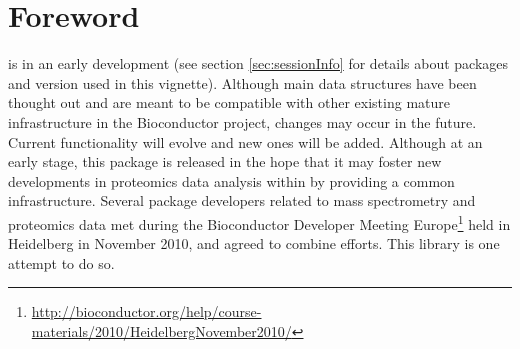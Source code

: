 \section*{Foreword}

 is in an early development %
(see section \ref{sec:sessionInfo} for details about packages and version used in this vignette). 
Although main data structures have been thought out and are meant to be compatible with other existing 
mature infrastructure in the Bioconductor project, changes may occur in the future. 
Current functionality will evolve and new ones will be added. 
Although at an early stage, this package is released in the hope that it may foster  
new developments in proteomics data analysis within \R by providing a common infrastructure. 
Several package developers related to mass spectrometry and proteomics data met during the 
Bioconductor Developer Meeting Europe\footnote{\url{http://bioconductor.org/help/course-materials/2010/HeidelbergNovember2010/}} 
held in Heidelberg in November 2010, and agreed to combine efforts. 
This library is one attempt to do so.
